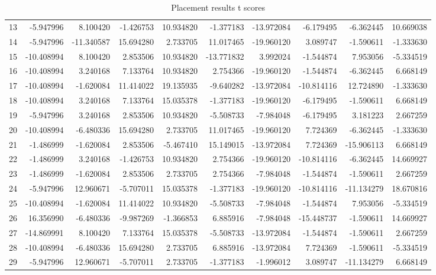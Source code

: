 \begin{table}
\begin{tabular}{lrrrrrrrrr}
13 &     -5.947996 &   8.100420 &  -1.426753 &  10.934820 &  -1.377183 & -13.972084 &   -6.179495 &  -6.362445 &  10.669038 \\
14 &     -5.947996 & -11.340587 &  15.694280 &   2.733705 &  11.017465 & -19.960120 &    3.089747 &  -1.590611 &  -1.333630 \\
15 &    -10.408994 &   8.100420 &   2.853506 &  10.934820 & -13.771832 &   3.992024 &   -1.544874 &   7.953056 &  -5.334519 \\
16 &    -10.408994 &   3.240168 &   7.133764 &  10.934820 &   2.754366 & -19.960120 &   -1.544874 &  -6.362445 &   6.668149 \\
17 &    -10.408994 &  -1.620084 &  11.414022 &  19.135935 &  -9.640282 & -13.972084 &  -10.814116 &  12.724890 &  -1.333630 \\
18 &    -10.408994 &   3.240168 &   7.133764 &  15.035378 &  -1.377183 & -19.960120 &   -6.179495 &  -1.590611 &   6.668149 \\
19 &     -5.947996 &   3.240168 &   2.853506 &  10.934820 &  -5.508733 &  -7.984048 &   -6.179495 &   3.181223 &   2.667259 \\
20 &    -10.408994 &  -6.480336 &  15.694280 &   2.733705 &  11.017465 & -19.960120 &    7.724369 &  -6.362445 &  -1.333630 \\
21 &     -1.486999 &  -1.620084 &   2.853506 &  -5.467410 &  15.149015 & -13.972084 &    7.724369 & -15.906113 &   6.668149 \\
22 &     -1.486999 &   3.240168 &  -1.426753 &  10.934820 &   2.754366 & -19.960120 &  -10.814116 &  -6.362445 &  14.669927 \\
23 &     -1.486999 &  -1.620084 &   2.853506 &   2.733705 &   2.754366 &  -7.984048 &   -1.544874 &  -1.590611 &   2.667259 \\
24 &     -5.947996 &  12.960671 &  -5.707011 &  15.035378 &  -1.377183 & -19.960120 &  -10.814116 & -11.134279 &  18.670816 \\
25 &    -10.408994 &  -1.620084 &  11.414022 &  10.934820 &  -5.508733 &  -7.984048 &   -1.544874 &   7.953056 &  -5.334519 \\
26 &     16.356990 &  -6.480336 &  -9.987269 &  -1.366853 &   6.885916 &  -7.984048 &  -15.448737 &  -1.590611 &  14.669927 \\
27 &    -14.869991 &   8.100420 &   7.133764 &  15.035378 &  -5.508733 & -13.972084 &   -1.544874 &  -1.590611 &   2.667259 \\
28 &    -10.408994 &  -6.480336 &  15.694280 &   2.733705 &   6.885916 & -13.972084 &    7.724369 &  -1.590611 &  -5.334519 \\
29 &     -5.947996 &  12.960671 &  -5.707011 &   2.733705 &  -1.377183 &  -1.996012 &    3.089747 & -11.134279 &   6.668149 \\
\bottomrule
\end{tabular}
\caption{Placement results t scores}
\end{table}

